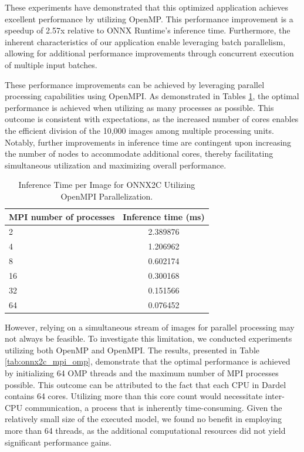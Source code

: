\documentclass[fleqn,10pt]{olplainarticle}
\begin{document}
These experiments have demonstrated that this optimized application achieves excellent performance by utilizing OpenMP. This performance improvement is a speedup of 2.57x relative to ONNX Runtime's inference time. Furthermore, the inherent characteristics of our application enable leveraging batch parallelism, allowing for additional performance improvements through concurrent execution of multiple input batches.

These performance improvements can be achieved by leveraging parallel processing capabilities using OpenMPI. As demonstrated in Tables \ref{tab:onnx2c_mpi}, the optimal performance is achieved when utilizing as many processes as possible. This outcome is consistent with expectations, as the increased number of cores enables the efficient division of the 10,000 images among multiple processing units. Notably, further improvements in inference time are contingent upon increasing the number of nodes to accommodate additional cores, thereby facilitating simultaneous utilization and maximizing overall performance.

\begin{table}[!ht]
    \centering
    \begin{tabular}{|l|c|}
    \hline
    \textbf{MPI number of processes} & \textbf{Inference time (ms)} \\ \hline
    2                                & 2.389876                     \\ \hline
    4                                & 1.206962                     \\ \hline
    8                                & 0.602174                     \\ \hline
    16                               & 0.300168                     \\ \hline
    32                               & 0.151566                     \\ \hline
    64                               & 0.076452                     \\ \hline
    \end{tabular}
    \caption{Inference Time per Image for ONNX2C Utilizing OpenMPI Parallelization.}
    \label{tab:onnx2c_mpi}
\end{table}

However, relying on a simultaneous stream of images for parallel processing may not always be feasible. To investigate this limitation, we conducted experiments utilizing both OpenMP and OpenMPI. The results, presented in Table \ref{tab:onnx2c_mpi_omp}, demonstrate that the optimal performance is achieved by initializing 64 OMP threads and the maximum number of MPI processes possible. This outcome can be attributed to the fact that each CPU in Dardel contains 64 cores. Utilizing more than this core count would necessitate inter-CPU communication, a process that is inherently time-consuming. Given the relatively small size of the executed model, we found no benefit in employing more than 64 threads, as the additional computational resources did not yield significant performance gains.
\end{document}
